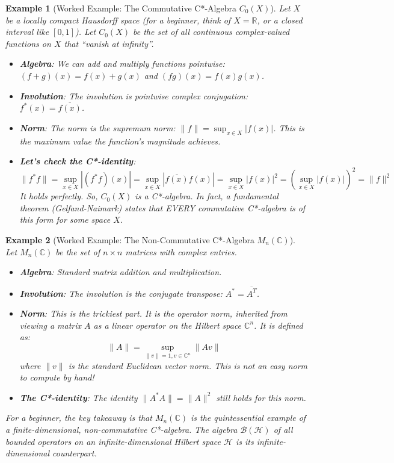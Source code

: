 \documentclass[11pt, a4paper]{article}
\theoremstyle{colored_def}
\theoremstyle{colored_thm}
\theoremstyle{colored_ex}
\newtheorem{example}{Example}[section]
\newcommand{\C}{\mathbb{C}}
\newcommand{\R}{\mathbb{R}}
\newcommand{\Hil}{\mathcal{H}}
\newcommand{\B}{\mathcal{B}}
\begin{document}
\begin{example}[Worked Example: The Commutative C*-Algebra $C_0(X)$]\label{ex:commutative-cstar}
Let $X$ be a locally compact Hausdorff space (for a beginner, think of $X = \R$, or a closed interval like $[0,1]$). Let $C_0(X)$ be the set of all continuous complex-valued functions on $X$ that ``vanish at infinity''.
\begin{itemize}
    \item \textbf{Algebra}: We can add and multiply functions pointwise: $(f+g)(x) = f(x)+g(x)$ and $(fg)(x) = f(x)g(x)$.
    \item \textbf{Involution}: The involution is pointwise complex conjugation: $f^*(x) = \overline{f(x)}$.
    \item \textbf{Norm}: The norm is the supremum norm: $\|f\| = \sup_{x \in X} |f(x)|$. This is the maximum value the function's magnitude achieves.
    \item \textbf{Let's check the C*-identity}:
    $$ \|f^*f\| = \sup_{x \in X} |(f^*f)(x)| = \sup_{x \in X} |\overline{f(x)}f(x)| = \sup_{x \in X} |f(x)|^2 = (\sup_{x \in X} |f(x)|)^2 = \|f\|^2 $$
    It holds perfectly. So, $C_0(X)$ is a C*-algebra. In fact, a fundamental theorem (Gelfand-Naimark) states that EVERY commutative C*-algebra is of this form for some space $X$.
\end{itemize}
\end{example}

\begin{example}[Worked Example: The Non-Commutative C*-Algebra $M_n(\C)$]\label{ex:matrix-cstar}
Let $M_n(\C)$ be the set of $n \times n$ matrices with complex entries.
\begin{itemize}
    \item \textbf{Algebra}: Standard matrix addition and multiplication.
    \item \textbf{Involution}: The involution is the conjugate transpose: $A^* = \overline{A^T}$.
    \item \textbf{Norm}: This is the trickiest part. It is the operator norm, inherited from viewing a matrix $A$ as a linear operator on the Hilbert space $\C^n$. It is defined as:
    $$ \|A\| = \sup_{\|v\|=1, v \in \C^n} \|Av\| $$
    where $\|v\|$ is the standard Euclidean vector norm. This is not an easy norm to compute by hand!
    \item \textbf{The C*-identity}: The identity $\|A^*A\| = \|A\|^2$ still holds for this norm.
\end{itemize}
For a beginner, the key takeaway is that $M_n(\C)$ is the quintessential example of a finite-dimensional, non-commutative C*-algebra. The algebra $\B(\Hil)$ of all bounded operators on an infinite-dimensional Hilbert space $\Hil$ is its infinite-dimensional counterpart.
\end{example}
\end{document}
